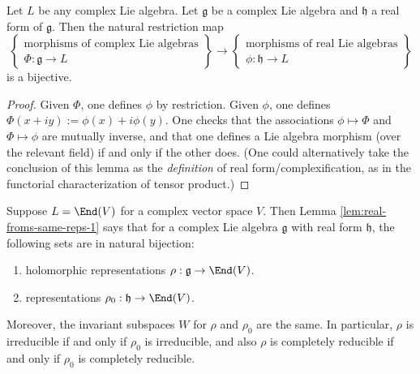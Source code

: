 \documentclass[reqno]{amsart} 
\begin{document}
\begin{lemma}\label{lem:real-froms-same-reps-1}
  Let $L$ be any complex Lie algebra.
  Let $\mathfrak{g}$ be a complex Lie algebra
  and $\mathfrak{h}$ a real form of $\mathfrak{g}$.
  Then the natural restriction map
  \begin{equation*}
    \left\{
      \begin{gathered}
        \text{morphisms of complex Lie algebras} \\
        \Phi : \mathfrak{g} \rightarrow L
      \end{gathered}
    \right\}
    \rightarrow 
    \left\{
      \begin{gathered}
        \text{morphisms of real Lie algebras} \\
        \phi : \mathfrak{h} \rightarrow L
      \end{gathered}
    \right\}
  \end{equation*}
  is a bijective.
\end{lemma}
\begin{proof}
  Given $\Phi$, one defines $\phi$ by restriction.
  Given $\phi$, one defines $\Phi(x + i y) := \phi(x) + i
  \phi(y)$.
  One checks that the associations $\phi \mapsto \Phi$
  and $\Phi \mapsto \phi$ are mutually inverse, and that one
  defines a Lie algebra morphism (over the relevant field)
  if and only if the other does.  (One could alternatively take the conclusion
  of this lemma as the \emph{definition} of real form/complexification, as in the functorial characterization of tensor product.)
\end{proof}

\begin{example}\label{ex:complex-vs-real-reps}
  Suppose $L = \End(V)$ for a complex vector space $V$.
  Then Lemma \ref{lem:real-froms-same-reps-1}
  says that
  for a complex Lie algebra $\mathfrak{g}$ with real  form
  $\mathfrak{h}$,
  the following sets are in natural bijection:
  \begin{enumerate}
  \item 
    holomorphic representations
    $\rho : \mathfrak{g} \rightarrow \End(V)$.
  \item 
    representations
    $\rho_0 : \mathfrak{h} \rightarrow \End(V)$.
  \end{enumerate}
  Moreover, the invariant subspaces $W$ for $\rho$ and $\rho_0$
  are the same.  In particular, $\rho$ is irreducible if and
  only if $\rho_0$ is irreducible, and also $\rho$ is completely
  reducible if and only if $\rho_0$ is completely reducible.
\end{example}
\end{document}
